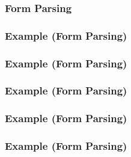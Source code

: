 \begin{frame}
  \frametitle{Form Parsing}
  
\end{frame}

\begin{frame}
\end{frame}

\begin{frame}
  \frametitle{Example (Form Parsing)}
  
\end{frame}

\begin{frame}
  \frametitle{Example (Form Parsing)}
  
\end{frame}

\begin{frame}
  \frametitle{Example (Form Parsing)}
  
\end{frame}

\begin{frame}
  \frametitle{Example (Form Parsing)}
  
\end{frame}


\begin{frame}
  \frametitle{Example (Form Parsing)}
  
\end{frame}

\begin{frame}
\end{frame}


